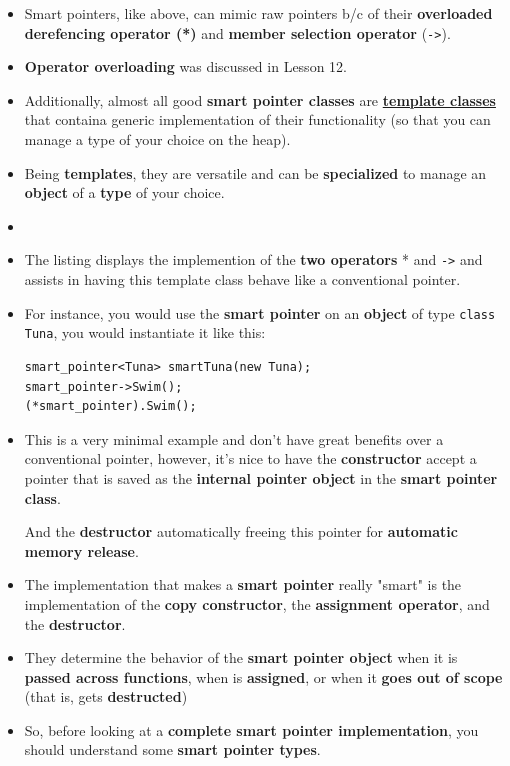 \documentclass[10pt]{article}
\newcommand{\pbreak}{\vspace{30pt}}
\begin{document}
\begin{itemize}
	\item Smart pointers, like above, can mimic raw pointers b/c of their \textbf{overloaded derefencing operator (*)} and \textbf{member selection operator }(\verb|->|).
	\item \textbf{Operator overloading} was discussed in Lesson 12.

	\item Additionally, almost all good \textbf{smart pointer classes} are \underline{\textbf{template classes}} that containa generic implementation of their functionality (so that you can manage a type of your choice on the heap).

	\item Being \textbf{templates}, they are versatile and can be \textbf{specialized} to manage an \textbf{object} of a \textbf{type} of your choice.

	\item {}

		\pbreak

	\item The listing displays the implemention of the \textbf{two operators} * and \verb|->| and assists in having this template class behave like a conventional pointer.

	\item For instance, you would use the \textbf{smart pointer} on an \textbf{object} of type \verb|class Tuna|, you would instantiate it like this:
		\begin{verbatim}
smart_pointer<Tuna> smartTuna(new Tuna);
smart_pointer->Swim();
(*smart_pointer).Swim();
		\end{verbatim}

	\item This is a very minimal example and don't have great benefits over a conventional pointer, however, it's nice to have the \textbf{constructor} accept a pointer that is saved as the \textbf{internal pointer object} in the \textbf{smart pointer class}.

		And the \textbf{destructor} automatically freeing this pointer for \textbf{automatic memory release}.

\end{itemize}
		\begin{tcolorbox}
			\begin{itemize}
				\item The implementation that makes a \textbf{smart pointer} really "smart" is the implementation of the \textbf{copy constructor}, the \textbf{assignment operator}, and the \textbf{destructor}.

				\item They determine the behavior of the \textbf{smart pointer object} when it is \textbf{passed across functions}, when is \textbf{assigned}, or when it \textbf{goes out of scope} (that is, gets \textbf{destructed})

				\item So, before looking at a \textbf{complete smart pointer implementation}, you should understand some \textbf{smart pointer types}.
			\end{itemize}
		\end{tcolorbox}
\end{document}
